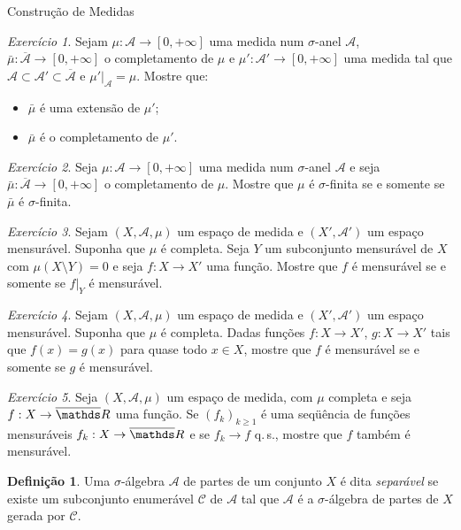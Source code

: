 \documentclass[oneside,final,11pt]{amsbook}
\newcommand{\R}{\mathds R}
\newcommand{\qs}{\hbox{q.$\,$s.}}
\theoremstyle{remark}\newtheorem{exercise}{Exercício}[chapter]
\theoremstyle{remark}\newtheorem{*exercise}[exercise]{\hbox to 0pt{\hskip 0pt minus 1fil*}Exercício}
\theoremstyle{definition}\newtheorem{exdefin}{Definição}[chapter]
\theoremstyle{plain}\newtheorem{teo}{Teorema}[section]
\theoremstyle{plain}\newtheorem{lem}[teo]{Lema}
\theoremstyle{plain}\newtheorem{prop}[teo]{Proposição}
\theoremstyle{plain}\newtheorem{cor}[teo]{Corolário}
\theoremstyle{definition}\newtheorem{defin}[teo]{Definição}
\theoremstyle{remark}\newtheorem{rem}[teo]{Observação}
\theoremstyle{definition}\newtheorem{notation}[teo]{Notação}
\theoremstyle{definition}\newtheorem{convention}[teo]{Convenção}
\theoremstyle{definition}\newtheorem{example}[teo]{Exemplo}
\numberwithin{section}{chapter}
\numberwithin{equation}{section}
\begin{document}
\begin{chapter}{Construção de Medidas}
\begin{exercise}\label{exe:complintermed}
Sejam $\mu:\mathcal A\to[0,+\infty]$ uma medida num $\sigma$-anel $\mathcal A$,
$\bar\mu:\overline{\mathcal A}\to[0,+\infty]$ o completamento de $\mu$ e $\mu':\mathcal A'\to[0,+\infty]$
uma medida tal que $\mathcal A\subset\mathcal A'\subset\overline{\mathcal A}$ e $\mu'\vert_{\mathcal A}=\mu$.
Mostre que:
\begin{itemize}
\item $\bar\mu$ é uma extensão de $\mu'$;
\item $\bar\mu$ é o completamento de $\mu'$.
\end{itemize}
\end{exercise}

\begin{exercise}\label{exe:complsigmafin}
Seja $\mu:\mathcal A\to[0,+\infty]$ uma medida num $\sigma$-anel $\mathcal A$ e seja
$\bar\mu:\overline{\mathcal A}\to[0,+\infty]$ o completamento de $\mu$. Mostre que
$\mu$ é $\sigma$-finita se e somente se $\bar\mu$ é $\sigma$-finita.
\end{exercise}

\begin{exercise}
Sejam $(X,\mathcal A,\mu)$ um espaço de medida e $(X',\mathcal A')$ um espaço mensurável.
Suponha que $\mu$ é completa. Seja $Y$ um subconjunto mensurável de $X$ com $\mu(X\setminus Y)=0$
e seja $f:X\to X'$ uma função. Mostre que $f$ é mensurável se e somente se $f\vert_Y$
é mensurável.
\end{exercise}

\begin{exercise}\label{exe:fquaseiggmens}
Sejam $(X,\mathcal A,\mu)$ um espaço de medida e $(X',\mathcal A')$ um espaço mensurável.
Suponha que $\mu$ é completa. Dadas funções $f:X\to X'$, $g:X\to X'$ tais que
$f(x)=g(x)$ para quase todo $x\in X$, mostre que $f$ é mensurável se e somente se
$g$ é mensurável.
\end{exercise}

\begin{exercise}
Seja $(X,\mathcal A,\mu)$ um espaço de medida, com $\mu$ completa
e seja $f:X\to\overline\R$ uma função. Se $(f_k)_{k\ge1}$
é uma seqüência de funções mensuráveis $f_k:X\to\overline\R$ e se $f_k\to f$ \qs,
mostre que $f$ também é mensurável.
\end{exercise}

\begin{exdefin}
Uma $\sigma$-álgebra $\mathcal A$ de partes de um conjunto $X$ é dita
{\em separável\/}%
 se existe um subconjunto
enumerável $\mathcal C$ de $\mathcal A$ tal que $\mathcal A$ é a $\sigma$-álgebra de
partes de $X$ gerada por $\mathcal C$.
\end{exdefin}


\end{chapter}
\end{document}
